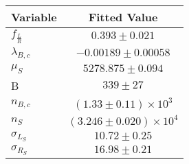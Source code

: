 \begin{tabular}[t]{lc}
\hline
Variable &Fitted Value\\
\hline\hline
$f_{\frac{L}{R}}$&$0.393\pm0.021$\\
\hline
$\lambda_{B,c}$&$-0.00189\pm0.00058$\\
\hline
$\mu_S$&$5278.875\pm0.094$\\
\hline
B&$339\pm27$\\
\hline
$n_{B,c}$&$(1.33\pm0.11)\times 10^3$\\
\hline
$n_S$&$(3.246\pm0.020)\times 10^4$\\
\hline
$\sigma_{L_S}$&$10.72\pm0.25$\\
\hline
$\sigma_{R_S}$&$16.98\pm0.21$\\
\hline
\end{tabular}